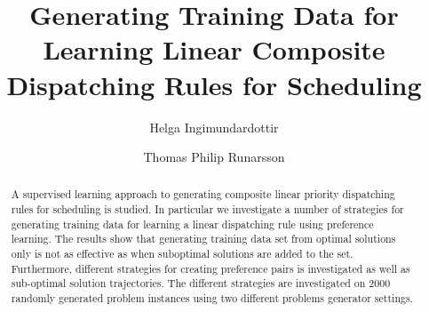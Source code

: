 \documentclass{svjour3}                     %
\begin{document}
\title{Generating Training Data for Learning Linear Composite Dispatching Rules for Scheduling}


\author{Helga Ingimundardottir \and Thomas Philip Runarsson 
}


\maketitle

\begin{abstract}
A supervised learning approach to generating composite linear priority dispatching rules for scheduling is studied. In particular we investigate a number of strategies for generating training data for learning a linear dispatching rule using preference learning. The results show that generating training data set from optimal solutions only is not as effective as when suboptimal solutions are added to the set. Furthermore, different strategies for creating preference pairs is investigated as well as sub-optimal solution trajectories. The different strategies are investigated on 2000 randomly generated problem instances using two different problems generator settings.
\end{abstract}
\end{document}
